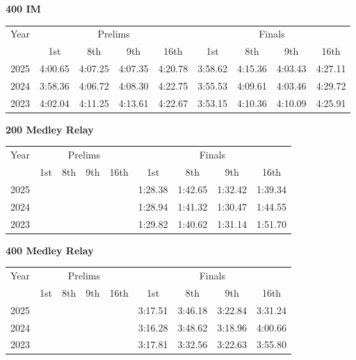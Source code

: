 \textbf{400 IM}

\begin{flushleft}
\begin{tabular}{|c|c|c|c|c|c|c|c|c|}
\hline
Year & \multicolumn{4}{c|}{Prelims} & \multicolumn{4}{c|}{Finals} \\
\cline{2-9}
& 1st & 8th & 9th & 16th & 1st & 8th & 9th & 16th \\
\hline
2025 & 4:00.65 & 4:07.25 & 4:07.35 & 4:20.78 & 3:58.62 & 4:15.36 & 4:03.43 & 4:27.11 \\
2024 & 3:58.36 & 4:06.72 & 4:08.30 & 4:22.75 & 3:55.53 & 4:09.61 & 4:03.46 & 4:29.72 \\
2023 & 4:02.04 & 4:11.25 & 4:13.61 & 4:22.67 & 3:53.15 & 4:10.36 & 4:10.09 & 4:25.91 \\
\hline
\end{tabular}
\end{flushleft}

\clearpage
\textbf{200 Medley Relay}

\begin{flushleft}
\begin{tabular}{|c|c|c|c|c|c|c|c|c|}
\hline
Year & \multicolumn{4}{c|}{Prelims} & \multicolumn{4}{c|}{Finals} \\
\cline{2-9}
& 1st & 8th & 9th & 16th & 1st & 8th & 9th & 16th \\
\hline
2025 &  &  &  &  & 1:28.38 & 1:42.65 & 1:32.42 & 1:39.34 \\
2024 &  &  &  &  & 1:28.94 & 1:41.32 & 1:30.47 & 1:44.55 \\
2023 &  &  &  &  & 1:29.82 & 1:40.62 & 1:31.14 & 1:51.70 \\
\hline
\end{tabular}
\end{flushleft}

\textbf{400 Medley Relay}

\begin{flushleft}
\begin{tabular}{|c|c|c|c|c|c|c|c|c|}
\hline
Year & \multicolumn{4}{c|}{Prelims} & \multicolumn{4}{c|}{Finals} \\
\cline{2-9}
& 1st & 8th & 9th & 16th & 1st & 8th & 9th & 16th \\
\hline
2025 &  &  &  &  & 3:17.51 & 3:46.18 & 3:22.84 & 3:31.24 \\
2024 &  &  &  &  & 3:16.28 & 3:48.62 & 3:18.96 & 4:00.66 \\
2023 &  &  &  &  & 3:17.81 & 3:32.56 & 3:22.63 & 3:55.80 \\
\hline
\end{tabular}
\end{flushleft}

